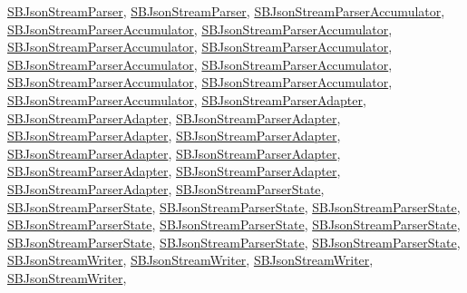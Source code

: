 \hyperlink{interface_s_b_json_stream_parser}{\-S\-B\-Json\-Stream\-Parser}, \hyperlink{interface_s_b_json_stream_parser}{\-S\-B\-Json\-Stream\-Parser}, \hyperlink{interface_s_b_json_stream_parser_accumulator}{\-S\-B\-Json\-Stream\-Parser\-Accumulator}, \hyperlink{interface_s_b_json_stream_parser_accumulator}{\-S\-B\-Json\-Stream\-Parser\-Accumulator}, \hyperlink{interface_s_b_json_stream_parser_accumulator}{\-S\-B\-Json\-Stream\-Parser\-Accumulator}, \hyperlink{interface_s_b_json_stream_parser_accumulator}{\-S\-B\-Json\-Stream\-Parser\-Accumulator}, \hyperlink{interface_s_b_json_stream_parser_accumulator}{\-S\-B\-Json\-Stream\-Parser\-Accumulator}, \hyperlink{interface_s_b_json_stream_parser_accumulator}{\-S\-B\-Json\-Stream\-Parser\-Accumulator}, \hyperlink{interface_s_b_json_stream_parser_accumulator}{\-S\-B\-Json\-Stream\-Parser\-Accumulator}, \hyperlink{interface_s_b_json_stream_parser_accumulator}{\-S\-B\-Json\-Stream\-Parser\-Accumulator}, \hyperlink{interface_s_b_json_stream_parser_accumulator}{\-S\-B\-Json\-Stream\-Parser\-Accumulator}, \hyperlink{interface_s_b_json_stream_parser_accumulator}{\-S\-B\-Json\-Stream\-Parser\-Accumulator}, \hyperlink{interface_s_b_json_stream_parser_adapter}{\-S\-B\-Json\-Stream\-Parser\-Adapter}, \hyperlink{interface_s_b_json_stream_parser_adapter}{\-S\-B\-Json\-Stream\-Parser\-Adapter}, \hyperlink{interface_s_b_json_stream_parser_adapter}{\-S\-B\-Json\-Stream\-Parser\-Adapter}, \hyperlink{interface_s_b_json_stream_parser_adapter}{\-S\-B\-Json\-Stream\-Parser\-Adapter}, \hyperlink{interface_s_b_json_stream_parser_adapter}{\-S\-B\-Json\-Stream\-Parser\-Adapter}, \hyperlink{interface_s_b_json_stream_parser_adapter}{\-S\-B\-Json\-Stream\-Parser\-Adapter}, \hyperlink{interface_s_b_json_stream_parser_adapter}{\-S\-B\-Json\-Stream\-Parser\-Adapter}, \hyperlink{interface_s_b_json_stream_parser_adapter}{\-S\-B\-Json\-Stream\-Parser\-Adapter}, \hyperlink{interface_s_b_json_stream_parser_adapter}{\-S\-B\-Json\-Stream\-Parser\-Adapter}, \hyperlink{interface_s_b_json_stream_parser_adapter}{\-S\-B\-Json\-Stream\-Parser\-Adapter}, \hyperlink{interface_s_b_json_stream_parser_state}{\-S\-B\-Json\-Stream\-Parser\-State}, \hyperlink{interface_s_b_json_stream_parser_state}{\-S\-B\-Json\-Stream\-Parser\-State}, \hyperlink{interface_s_b_json_stream_parser_state}{\-S\-B\-Json\-Stream\-Parser\-State}, \hyperlink{interface_s_b_json_stream_parser_state}{\-S\-B\-Json\-Stream\-Parser\-State}, \hyperlink{interface_s_b_json_stream_parser_state}{\-S\-B\-Json\-Stream\-Parser\-State}, \hyperlink{interface_s_b_json_stream_parser_state}{\-S\-B\-Json\-Stream\-Parser\-State}, \hyperlink{interface_s_b_json_stream_parser_state}{\-S\-B\-Json\-Stream\-Parser\-State}, \hyperlink{interface_s_b_json_stream_parser_state}{\-S\-B\-Json\-Stream\-Parser\-State}, \hyperlink{interface_s_b_json_stream_parser_state}{\-S\-B\-Json\-Stream\-Parser\-State}, \hyperlink{interface_s_b_json_stream_parser_state}{\-S\-B\-Json\-Stream\-Parser\-State}, \hyperlink{interface_s_b_json_stream_writer}{\-S\-B\-Json\-Stream\-Writer}, \hyperlink{interface_s_b_json_stream_writer}{\-S\-B\-Json\-Stream\-Writer}, \hyperlink{interface_s_b_json_stream_writer}{\-S\-B\-Json\-Stream\-Writer}, \hyperlink{interface_s_b_json_stream_writer}{\-S\-B\-Json\-Stream\-Writer}, 
